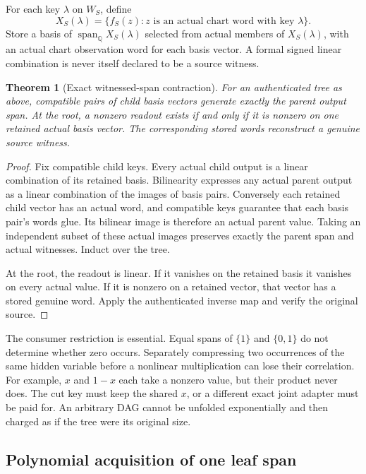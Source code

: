 \documentclass[11pt,letterpaper]{article}
\newtheorem{theorem}{Theorem}
\theoremstyle{definition}
\newcommand{\spanof}{\operatorname{span}}
\begin{document}
For each key $\lambda$ on $W_S$, define
\[
X_S(\lambda)=\{f_S(z):z\text{ is an actual chart word with key }\lambda\}.
\]
Store a basis of $\spanof_{\mathbb Q}X_S(\lambda)$ selected from actual members of $X_S(\lambda)$, with an actual chart observation word for each basis vector. A formal signed linear combination is never itself declared to be a source witness.

\begin{theorem}[Exact witnessed-span contraction]\label{thm:span}
For an authenticated tree as above, compatible pairs of child basis vectors generate exactly the parent output span. At the root, a nonzero readout exists if and only if it is nonzero on one retained actual basis vector. The corresponding stored words reconstruct a genuine source witness.
\end{theorem}
\begin{proof}
Fix compatible child keys. Every actual child output is a linear combination of its retained basis. Bilinearity expresses any actual parent output as a linear combination of the images of basis pairs. Conversely each retained child vector has an actual word, and compatible keys guarantee that each basis pair's words glue. Its bilinear image is therefore an actual parent value. Taking an independent subset of these actual images preserves exactly the parent span and actual witnesses. Induct over the tree.

At the root, the readout is linear. If it vanishes on the retained basis it vanishes on every actual value. If it is nonzero on a retained vector, that vector has a stored genuine word. Apply the authenticated inverse map and verify the original source.
\end{proof}

The consumer restriction is essential. Equal spans of $\{1\}$ and $\{0,1\}$ do not determine whether zero occurs. Separately compressing two occurrences of the same hidden variable before a nonlinear multiplication can lose their correlation. For example, $x$ and $1-x$ each take a nonzero value, but their product never does. The cut key must keep the shared $x$, or a different exact joint adapter must be paid for. An arbitrary DAG cannot be unfolded exponentially and then charged as if the tree were its original size.

\subsection{Polynomial acquisition of one leaf span}
\end{document}
